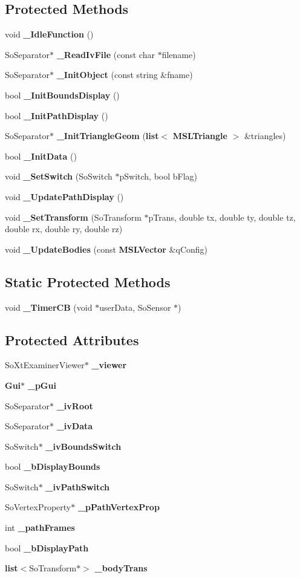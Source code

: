 \subsection*{Protected Methods}
\begin{CompactItemize}
\item 
void {\bf \_\-Idle\-Function} ()
\item 
So\-Separator$\ast$ {\bf \_\-Read\-Iv\-File} (const char $\ast$filename)
\item 
So\-Separator$\ast$ {\bf \_\-Init\-Object} (const string \&fname)
\item 
bool {\bf \_\-Init\-Bounds\-Display} ()
\item 
bool {\bf \_\-Init\-Path\-Display} ()
\item 
So\-Separator$\ast$ {\bf \_\-Init\-Triangle\-Geom} ({\bf list}$<$ {\bf MSLTriangle} $>$ \&triangles)
\item 
bool {\bf \_\-Init\-Data} ()
\item 
void {\bf \_\-Set\-Switch} (So\-Switch $\ast$p\-Switch, bool b\-Flag)
\item 
void {\bf \_\-Update\-Path\-Display} ()
\item 
void {\bf \_\-Set\-Transform} (So\-Transform $\ast$p\-Trans, double tx, double ty, double tz, double rx, double ry, double rz)
\item 
void {\bf \_\-Update\-Bodies} (const {\bf MSLVector} \&q\-Config)
\end{CompactItemize}
\subsection*{Static Protected Methods}
\begin{CompactItemize}
\item 
void {\bf \_\-Timer\-CB} (void $\ast$user\-Data, So\-Sensor $\ast$)
\end{CompactItemize}
\subsection*{Protected Attributes}
\begin{CompactItemize}
\item 
So\-Xt\-Examiner\-Viewer$\ast$ {\bf \_\-viewer}
\item 
{\bf Gui}$\ast$ {\bf \_\-p\-Gui}
\item 
So\-Separator$\ast$ {\bf \_\-iv\-Root}
\item 
So\-Separator$\ast$ {\bf \_\-iv\-Data}
\item 
So\-Switch$\ast$ {\bf \_\-iv\-Bounds\-Switch}
\item 
bool {\bf \_\-b\-Display\-Bounds}
\item 
So\-Switch$\ast$ {\bf \_\-iv\-Path\-Switch}
\item 
So\-Vertex\-Property$\ast$ {\bf \_\-p\-Path\-Vertex\-Prop}
\item 
int {\bf \_\-path\-Frames}
\item 
bool {\bf \_\-b\-Display\-Path}
\item 
{\bf list}$<$So\-Transform$\ast$$>$ {\bf \_\-body\-Trans}
\end{CompactItemize}



